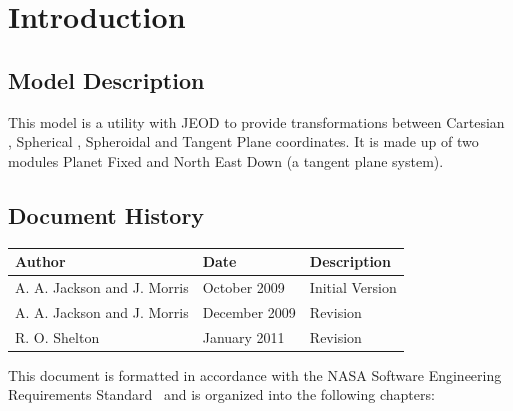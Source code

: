\documentclass[twoside,11pt,titlepage]{report}
\newcommand\documentHistory{
{\bf Author} & {\bf Date} & {\bf Description} \\ \hline \hline
A. A. Jackson and J. Morris & October 2009 &  Initial Version \\ \hline
A. A. Jackson and J. Morris & December 2009 & Revision \\ \hline
R. O. Shelton & January 2011 & Revision \\ \hline
}
\begin{document}

\date{\RELEASEMONTH\ \RELEASEYEAR}
\modelname{\PLANETFIXDesc}
\doctype{}
\author{\ModelAuthor}
\makeDynenvTitlepage


\setcounter{chapter}{0}
\tableofcontents
\vfill
\chapter{Introduction}\label{ch:intro}

\section{Model Description}
This model is a utility with JEOD to provide transformations between Cartesian , Spherical , Spheroidal and
Tangent Plane coordinates. It is made up of two modules Planet Fixed and North East Down (a tangent plane system).

\section{Document History}

\begin{tabular}{||l|l|l|} \hline
\documentHistory
\end{tabular}



This document is formatted in accordance with the
NASA Software Engineering Requirements Standard~\cite{NASA:SWE}
and is organized into the following chapters:
\end{document}
